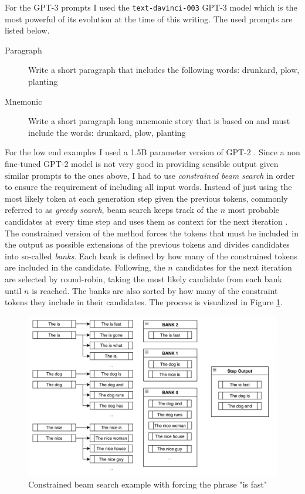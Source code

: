 For the GPT-3 prompts I used the \texttt{text-davinci-003} GPT-3 model which is the most powerful of its evolution at the time of this writing. The used prompts are listed below.
\begin{description}
    \item[Paragraph] Write a short paragraph that includes the following words: drunkard, plow, planting
    \item[Mnemonic] Write a short paragraph long mnemonic story that is based on and must include the words: drunkard, plow, planting
\end{description}
For the low end examples I used a 1.5B parameter version of GPT-2 \cite{radford2019language}. Since a non fine-tuned GPT-2 model is not very good in providing sensible output given similar prompts to the ones above, I had to use \emph{constrained beam search} in order to ensure the requirement of including all input words. Instead of just using the most likely token at each generation step given the previous tokens, commonly referred to as \emph{greedy search}, beam search keeps track of the $n$ most probable candidates at every time step and uses them as context for the next iteration \cite{kim2022guiding}. The constrained version of the method forces the tokens that must be included in the output as possible extensions of the previous tokens and divides candidates into so-called \emph{banks}. Each bank is defined by how many of the constrained tokens are included in the candidate. Following, the $n$ candidates for the next iteration are selected by round-robin, taking the most likely candidate from each bank until $n$ is reached. The banks are also sorted by how many of the constraint tokens they include in their candidates. The process is visualized in Figure \ref{figure:constrained_beam_search_example}.  
\begin{figure}
    \centering
    \includegraphics[width=400pt]{resources/cbeam_2.jpg}
    \caption{Constrained beam search example with forcing the phrase "is fast" \cite{kim2022guiding}}
    \label{figure:constrained_beam_search_example}
\end{figure}